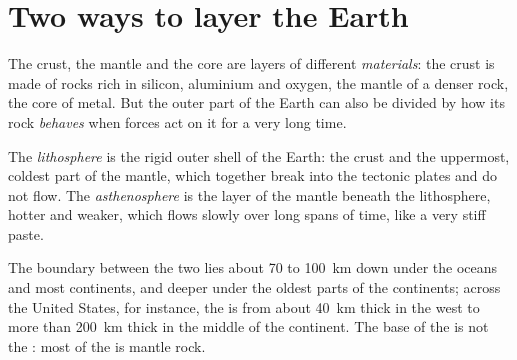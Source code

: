 \section{Two ways to layer the Earth}

The crust, the mantle and the core are layers of different
\emph{materials}: the crust is made of rocks rich in silicon, aluminium and
oxygen, the mantle of a denser rock, the core of metal. But the outer part of
the Earth can also be divided by how its rock \emph{behaves} when forces act
on it for a very long time.

\begin{definition}\label{def:g11:lithosphere-asthenosphere:lithosphere}
The \emph{lithosphere} is the rigid outer shell of the
Earth: the crust and the uppermost, coldest part of the mantle, which together
break into the tectonic plates and do not flow. The
\emph{asthenosphere} is the layer of the mantle beneath
the lithosphere, hotter and weaker, which flows
slowly over long spans of time, like a very stiff paste.
\end{definition}

The boundary between the two lies about 70 to \qty{100}{km} down under the
oceans and most continents, and deeper under the oldest parts of the
continents; across the United States, for instance, the  is from
about \qty{40}{km} thick in the west to more than \qty{200}{km} thick in the
middle of the continent. The base of the  is not the : most of
the  is mantle rock.

